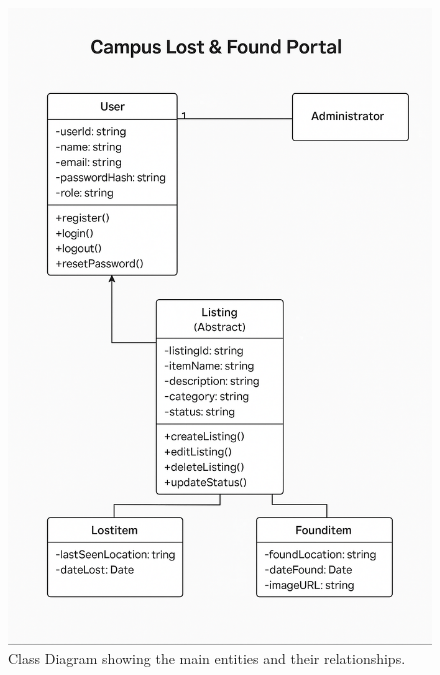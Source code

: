 \documentclass[11pt, a4paper]{article}
\begin{document}
\begin{figure}[h!]
    \centering
    \includegraphics[width=\textwidth]{class-diagram.png}
    \caption{Class Diagram showing the main entities and their relationships.}
    \label{fig:class}
\end{figure}
\newpage
\end{document}
